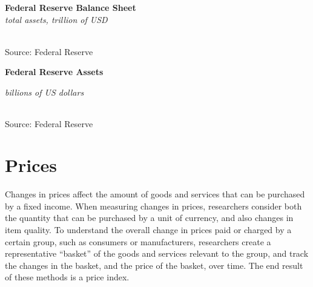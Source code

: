 \documentclass{report}
\makeatletter
\newcommand{\tbllink}[1]{\href{https://raw.githubusercontent.com/bdecon/US-chartbook/master/chartbook/data/#1}{\faTable}}
\newcommand*\short[1]{\expandafter\@gobbletwo\number\numexpr#1\relax}
\newcommand{\dateaxisticks}{
		date coordinates in=x, axis line style={draw=none},
		xmax={2022-03-15},
		max space between ticks=40,	    
		xtick={{1990-01-01}, {1992-01-01}, {1994-01-01}, 
			{1996-01-01}, {1998-01-01}, {2000-01-01}, 
			{2002-01-01}, {2004-01-01}, {2006-01-01},
			{2008-01-01}, {2010-01-01}, {2012-01-01}, {2014-01-01},
		    {2016-01-01}, {2018-01-01}, {2020-01-01}, {2022-01-01}, 
		    {2024-01-01}, {2026-01-01}},
		minor xtick={{1989-01-01}, {1991-01-01}, {1993-01-01},
			{1995-01-01}, {1997-01-01}, {1999-01-01}, 
			{2001-01-01}, {2003-01-01}, {2005-01-01}, {2007-01-01},
		    {2009-01-01}, {2011-01-01}, {2013-01-01}, {2015-01-01},
		    {2017-01-01}, {2019-01-01}, {2021-01-01}, {2023-01-01}, 
		    {2025-01-01}, {2027-01-01}},
		enlarge y limits={0.06}, enlarge x limits={0.01},
		}
\newcommand{\bbar}[2]{extra #1 ticks = {{#2}}, extra #1 tick labels = ,
		extra #1 tick style = {grid=major, grid style={thick, black!25}},}
\newcommand{\stdline}[4]{\addplot[very thick, no markers, color=#1] 
		table [x=#2, y=#3, col sep=comma] {#4};	}
\newcommand{\recbars}{
		\fill[color=black!10] (axis cs:{2007-12-01},\pgfkeysvalueof{/pgfplots/ymin}) rectangle 
			(axis cs:{2009-07-01}, \pgfkeysvalueof{/pgfplots/ymax});
		\fill[color=black!10] (axis cs:{2020-02-01},\pgfkeysvalueof{/pgfplots/ymin}) rectangle 
			(axis cs:{2020-05-01}, \pgfkeysvalueof{/pgfplots/ymax});}
\makeatother
\begin{document}
{{\begin{minipage}{0.76\textwidth}



\end{minipage}

\begin{minipage}{0.44\textwidth}
\normalsize \textbf{Federal Reserve Balance Sheet}\\
\footnotesize{\textit{total assets, trillion of USD}}\\
\hspace*{-2mm} \\
\footnotesize{Source: Federal Reserve} \hfill \tbllink{fed_assets.csv}
\end{minipage}\hspace{7mm}
\begin{minipage}{0.27\textwidth}
\small 
\end{minipage}
\vspace{8mm}

\begin{minipage}{0.76\textwidth}
\normalsize \textbf{Federal Reserve Assets}\\
\footnotesize{\textit{billions of US dollars}\\
 \setlength{\tabcolsep}{3.1pt} \color{black!90}
{\renewcommand{\arraystretch}{1.54}
	\begin{tabular}{p{40mm} R{13.0mm} R{13.0mm} R{13.0mm} R{13.0mm} R{13.0mm}}
		 \hline
	\end{tabular}
}}
		
\vspace{-2mm}
\footnotesize{Source: Federal Reserve}
\end{minipage}
\newpage
\begin{minipage}{0.76\textwidth}
\section*{Prices}
\hypertarget{pr}{}
\vspace{-1mm}
\small Changes in prices affect the amount of goods and services that can be purchased by a fixed income. When measuring changes in prices, researchers consider both the quantity that can be purchased by a unit of currency, and also changes in item quality. To understand the overall change in prices paid or charged by a certain group, such as consumers or manufacturers, researchers create a representative ``basket'' of the goods and services relevant to the group, and track the changes in the basket, and the price of the basket, over time. The end result of these methods is a price index.


\end{minipage}}}
\end{document}
